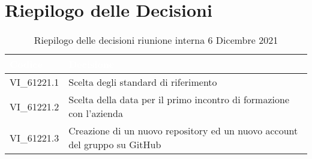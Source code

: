 \section{Riepilogo delle Decisioni}


\begin{table}[!htbp]
\renewcommand{\arraystretch}{1.5}
\begin{tabular}{m{}<{\centering}  m{}<{\centering}}
\rowcolor{darkblue} \textcolor{white}{\textbf{Codice}} & \textcolor{white}{\textbf{Decisione}} \\
\hline
VI\_61221.1 & Scelta degli standard di riferimento \\
\rowcolor{gray!10} VI\_61221.2 & Scelta della data per il primo incontro di formazione con l'azienda \\
VI\_61221.3 & Creazione di un nuovo repository ed un nuovo account del gruppo su GitHub \\
\end{tabular}
\caption{Riepilogo delle decisioni riunione interna 6 Dicembre 2021}
\end{table}